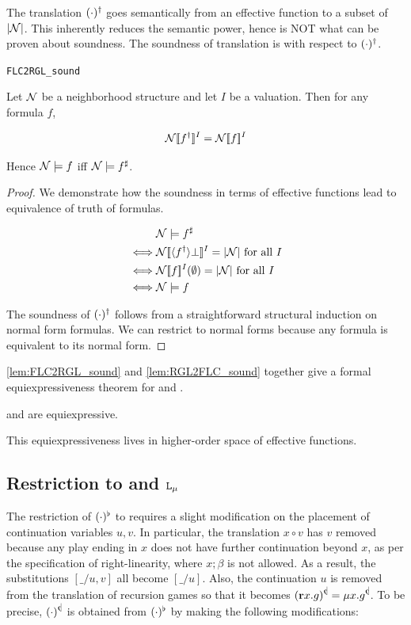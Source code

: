 The translation $(\cdot)^{\dagger}$ goes semantically from an effective function to a subset of $|\mathcal N|$. This inherently reduces the semantic power, hence is NOT what can be proven about soundness. The soundness of translation is with respect to $(\cdot)^{\dagger}$.

\begin{blemma}
\label{lem:FLC2RGL_sound}
\texttt{FLC2RGL\_sound}

Let $\mathcal N$ be a neighborhood structure and let $I$ be a valuation. Then
for any \FLC{} formula $f$,

\begin{equation*}
    \mathcal N[\![ f^{\dagger}]\!]^I = \mathcal N [\![ f]\!]^I
\end{equation*}

Hence $\mathcal N\models f $ iff $\mathcal N\models f^{\sharp}$.
\end{blemma}
\begin{proof}
    We demonstrate how the soundness in terms of effective functions lead to equivalence of truth of formulas. 

    \begin{align*}
         & \mathcal N \models f^{\sharp} \\
    \iff & \mathcal N [\![ \langle f^{\dagger}\rangle \bot]\!]^I = |\mathcal N| \text{ for all } I\\
    \iff & \mathcal N [\![ f]\!]^I(\emptyset) = |\mathcal N| \text{ for all } I \\
    \iff & \mathcal N \models f
    \end{align*}

    The soundness of $(\cdot)^{\dagger}$ follows from a straightforward structural induction on \FLC{} normal form formulas. We can restrict to normal forms because any \FLC{} formula is equivalent to its normal form.
\end{proof}

\autoref{lem:FLC2RGL_sound} and \autoref{lem:RGL2FLC_sound} together give a formal equiexpressiveness theorem for \RGL{} and \FLC{}. 

\begin{theorem}
    \RGL{} and \FLC{} are equiexpressive.
\end{theorem}

This equiexpressiveness lives in higher-order space of effective functions.

\subsection{Restriction to \rlGL{} and \texorpdfstring{$\texttt{L}_\mu{}$}{}}
\label{subsec:trans_rlGL_Lmu}
The restriction of $(\cdot)^{\flat}$ to \rlGL{} requires a slight modification on the placement of continuation variables $u,v$. In particular, the translation $x\circ v$ has $v$ removed because any play ending in $x$ does not have further continuation beyond $x$, as per the specification of right-linearity, where $x ; \beta$ is not allowed. As a result, the substitutions $[\_/ u,v]$ all become $[\_/ u]$. Also, the continuation $u$ is removed from the translation of recursion games so that it becomes $\rlL{(\Rec x. g)}=\mu x.\rlL{g}$. To be precise, $\rlL{(\cdot)}$ is obtained from $(\cdot)^{\flat}$ by making the following modifications:

